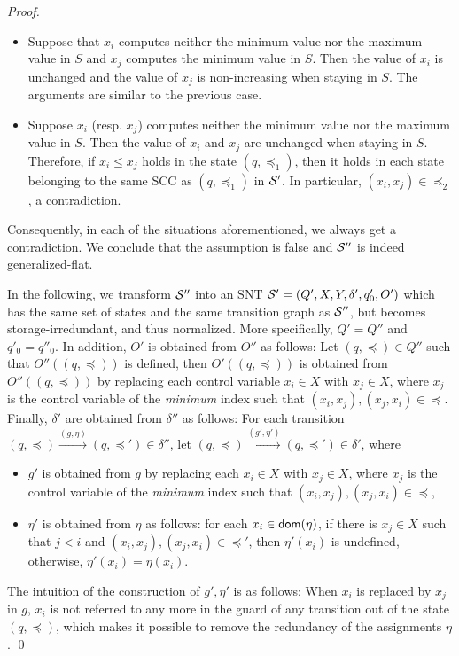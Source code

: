 \begin{appendix}
{\begin{proof}
\begin{itemize}
%
\item Suppose that $x_i$ computes neither the minimum value nor the maximum value in $S$ and $x_j$ computes the minimum value in $S$. Then the value of $x_i$ is unchanged and the value of $x_j$ is non-increasing when staying in $S$. The arguments are similar to the previous case.
%
\item Suppose $x_i$ (resp. $x_j$) computes neither  the minimum value nor the maximum value in $S$. Then the value of $x_i$ and $x_j$ are unchanged when staying in $S$. Therefore, if $x_i \le x_j$ holds in the state $(q, \preceq_1)$, then it holds in each state belonging to the same SCC as $(q, \preceq_1)$ in ${\mathcal{S} }'$. In particular, $(x_i, x_j) \in \preceq_2$, a contradiction.
\end{itemize}
Consequently, in each of the situations aforementioned, we always get a contradiction. 
%
We conclude that the assumption is false and ${\mathcal{S} }''$ is indeed generalized-flat.

In the following, we transform ${\mathcal{S} }''$ into an SNT ${\mathcal{S} }' = (Q', X, Y, \delta', q'_0, O')$ which has the same set of states and the same transition graph as ${\mathcal{S} }''$, but becomes storage-irredundant, and thus normalized. More specifically, 
$Q' = Q''$ and
$q'_0 = q''_0$.
In addition, $O'$ is obtained from $O''$ as follows: Let $(q, \preceq) \in Q''$ such that $O''((q, \preceq))$ is defined, then $O'((q, \preceq))$ is obtained from $O''((q, \preceq))$ by replacing each control variable $x_i \in X$ with $x_j \in X$, where $x_j$ is the control variable of the \emph{minimum} index such that $(x_i, x_j), (x_j, x_i) \in \preceq$. Finally, $\delta'$ are obtained from $\delta''$ as follows: For each transition $(q, \preceq) \xrightarrow{(g,\eta)} (q, \preceq') \in \delta''$, let $(q, \preceq) \xrightarrow{(g', \eta')} (q, \preceq') \in \delta'$, where 
\begin{itemize}
\item $g'$ is obtained from $g$ by replacing each $x_i \in X$ with $x_j \in X$, where $x_j$ is the control variable of the \emph{minimum} index such that $(x_i, x_j), (x_j, x_i) \in \preceq$, 
\item 
$\eta'$ is obtained from $\eta$ as follows: for each $x_i \in \mathsf{dom}(\eta)$, if there is $x_j \in X$ such that $j < i$ and $(x_i, x_j), (x_j, x_i) \in \preceq'$, then $\eta'(x_i)$ is undefined, otherwise, $\eta'(x_i) = \eta(x_i)$.
\end{itemize}
The intuition of the construction of $g', \eta'$ is as follows: When $x_i$ is replaced by $x_j$ in $g$, $x_i$ is not referred to any more in the guard of any transition out of the state $(q, \preceq)$, which makes it possible to remove the redundancy of the assignments $\eta$.
\qed
\end{proof}
}



\end{appendix}
